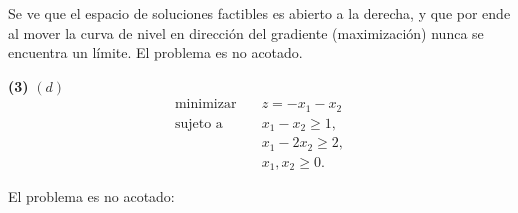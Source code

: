 \documentclass[12pt]{article}
\begin{document}
\begin{center}
\end{center}

Se ve que el espacio de soluciones factibles es abierto a la derecha, y que por
ende al mover la curva de nivel en dirección del gradiente (maximización) nunca
se encuentra un límite. El problema es no acotado.

















\pagebreak 

\begin{myframe}

    \textbf{(3)} $(d)$
\[
\begin{aligned}
\text{minimizar} \quad & z = -x_1 - x_2 \\
\text{sujeto a} \quad
& x_1 - x_2 \geq 1, \\
& x_1 - 2x_2 \geq 2, \\
& x_1, x_2 \geq 0.
\end{aligned}
\]
\end{myframe}

El problema es no acotado: 
\end{document}
